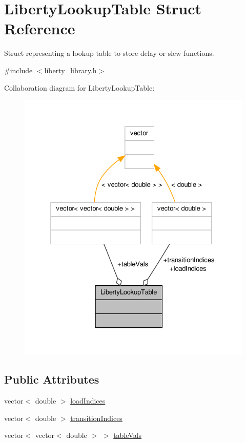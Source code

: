 \hypertarget{structLibertyLookupTable}{\section{Liberty\-Lookup\-Table Struct Reference}
\label{structLibertyLookupTable}
}


Struct representing a lookup table to store delay or slew functions.  




{\ttfamily \#include $<$liberty\-\_\-library.\-h$>$}



Collaboration diagram for Liberty\-Lookup\-Table\-:\nopagebreak
\begin{figure}[H]
\begin{center}
\leavevmode
\includegraphics[width=327pt]{structLibertyLookupTable__coll__graph}
\end{center}
\end{figure}
\subsection*{Public Attributes}
\begin{DoxyCompactItemize}
\item 
vector$<$ double $>$ \hyperlink{structLibertyLookupTable_aa9185452db835be3f9c603c3f3df5562}{load\-Indices}
\item 
vector$<$ double $>$ \hyperlink{structLibertyLookupTable_a1f7a1d2e84535f8c7df9bac33732634d}{transition\-Indices}
\item 
vector$<$ vector$<$ double $>$ $>$ \hyperlink{structLibertyLookupTable_a1ca823f563ac9e3e8a616b09a19da596}{table\-Vals}
\end{DoxyCompactItemize}


